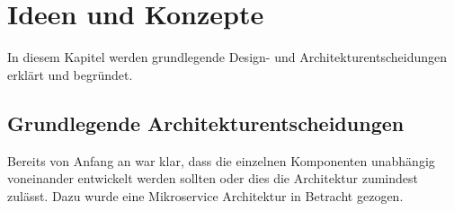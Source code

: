 \chapter{Ideen und Konzepte}




%



%
%

In diesem Kapitel werden grundlegende Design- und Architekturentscheidungen erklärt
und begründet.

\section{Grundlegende Architekturentscheidungen}
\label{konzepte:microservices}

Bereits von Anfang an war klar, dass die einzelnen Komponenten unabhängig voneinander
entwickelt werden sollten oder dies die Architektur zumindest zulässt. Dazu wurde
eine Mikroservice Architektur in Betracht gezogen.

